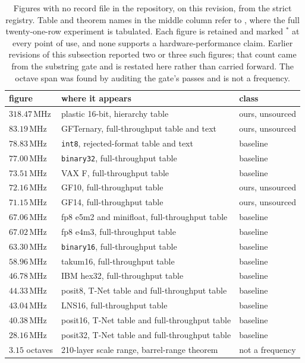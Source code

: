\begin{table}[t]\centering
\caption{Figures with no record file in the repository, on this revision, from the
strict registry. Table and theorem names in the middle column refer to
\recordname, where the full twenty-one-row experiment is tabulated. Each figure
is retained and marked $^{\ast}$ at every point of use, and
none supports a hardware-performance claim. Earlier revisions of this subsection
reported two or three such figures; that count came from the substring gate and is
restated here rather than carried forward. The octave span was found by auditing
the gate's passes and is not a frequency.}
\label{tab:untraced}
\begin{tabular}{lll}
\toprule
figure & where it appears & class \\
\midrule
$318.47$\,MHz & plastic 16-bit, hierarchy table & ours, unsourced \\
$83.19$\,MHz & GFTernary, full-throughput table and text & ours, unsourced \\
$78.83$\,MHz & \texttt{int8}, rejected-format table and text & baseline \\
$77.00$\,MHz & \texttt{binary32}, full-throughput table & baseline \\
$73.51$\,MHz & VAX F, full-throughput table & baseline \\
$72.16$\,MHz & GF10, full-throughput table & ours, unsourced \\
$71.15$\,MHz & GF14, full-throughput table & ours, unsourced \\
$67.06$\,MHz & fp8 e5m2 and minifloat, full-throughput table & baseline \\
$67.02$\,MHz & fp8 e4m3, full-throughput table & baseline \\
$63.30$\,MHz & \texttt{binary16}, full-throughput table & baseline \\
$58.96$\,MHz & takum16, full-throughput table & baseline \\
$46.78$\,MHz & IBM hex32, full-throughput table & baseline \\
$44.33$\,MHz & posit8, T-Net table and full-throughput table & baseline \\
$43.04$\,MHz & LNS16, full-throughput table & baseline \\
$40.38$\,MHz & posit16, T-Net table and full-throughput table & baseline \\
$28.16$\,MHz & posit32, T-Net table and full-throughput table & baseline \\
\addlinespace
$3.15$ octaves & 210-layer scale range, barrel-range theorem & not a frequency \\
\bottomrule
\end{tabular}
\end{table}

